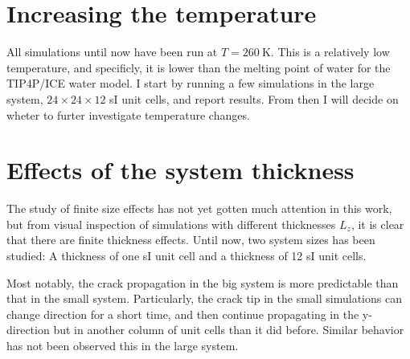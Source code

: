 \section{Increasing the temperature}
All simulations until now have been run at $T=\SI{260}{\kelvin}$. This is a relatively low temperature, and specificly, it is lower than the melting point of water for the TIP4P/ICE water model. I start by running a few simulations in the large system, $24\times 24\times 12$ sI unit cells, and report results. From then I will decide on wheter to furter investigate temperature changes.



\section{Effects of the system thickness}
The study of finite size effects has not yet gotten much attention in this work, but from visual inspection of simulations with different thicknesses $L_z$, it is clear that there are finite thickness effects. Until now, two system sizes has been studied: A thickness of one sI unit cell and a thickness of 12 sI unit cells. 

Most notably, the crack propagation in the big system is more predictable than that in the small system. Particularly, the crack tip in the small simulations can change direction for a short time, and then continue propagating in the y-direction but in another column of unit cells than it did before. Similar behavior has not been observed this in the large system.


